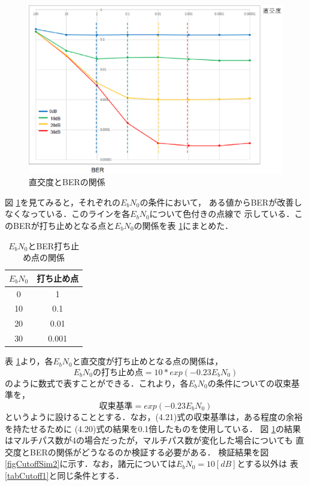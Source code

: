 \begin{figure}[ht]
    \centering
    \includegraphics[width=0.95\linewidth]{chapter4/figure/CutoffSim1.eps}
    \caption{直交度とBERの関係}
    \label{figCutoffSim1}
\end{figure}

図 \ref{figCutoffSim1}を見てみると，それぞれの$E_bN_0$の条件において，
ある値からBERが改善しなくなっている．このラインを各$E_bN_0$について色付きの点線で
示している．このBERが打ち止めとなる点と$E_bN_0$の関係を表 \ref{tabCutoff2}にまとめた．

\begin{table}[ht]
    \begin{tabular}{|c|c|} \hline
        $E_bN_0$ & 打ち止め点 \\ \hline
        0 & 1 \\ \hline
        10 & 0.1 \\ \hline
        20 & 0.01 \\ \hline
        30 & 0.001 \\ \hline
    \end{tabular}
    \centering
    \caption{$E_bN_0$とBER打ち止め点の関係}
    \label{tabCutoff2}
\end{table}

表 \ref{tabCutoff2}より，各$E_bN_0$と直交度が打ち止めとなる点の関係は，
\begin{equation}
    E_bN_0の打ち止め点 = 10*exp(-0.23E_bN_0)
\end{equation}
のように数式で表すことができる．これより，各$E_bN_0$の条件についての収束基準を，
\begin{equation}
    収束基準 = exp(-0.23E_bN_0)
\end{equation}
というように設けることとする．なお，(4.21)式の収束基準は，ある程度の余裕を持たせるために
(4.20)式の結果を0.1倍したものを使用している．
図 \ref{figCutoffSim1}の結果はマルチパス数が4の場合だったが，マルチパス数が変化した場合についても
直交度とBERの関係がどうなるのか検証する必要がある．
検証結果を図 \ref{figCutoffSim2}に示す．なお，諸元については$E_bN_0=10[dB]$とする以外は
表 \ref{tabCutoff1}と同じ条件とする．


